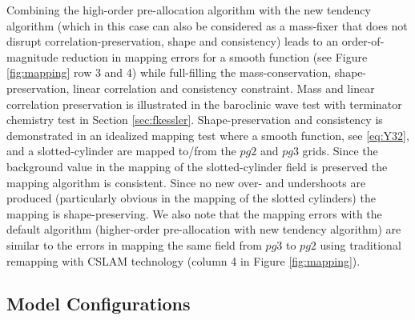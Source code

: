 \documentclass{agujournal}
\begin{document}
Combining the high-order pre-allocation algorithm with the new tendency algorithm (which in this case can also be considered as a mass-fixer that does not disrupt correlation-preservation, shape and consistency) leads to an order-of-magnitude reduction in mapping errors for a smooth function (see Figure \ref{fig:mapping} row 3 and 4) while full-filling the mass-conservation, shape-preservation, linear correlation and consistency  constraint. Mass and linear correlation preservation is illustrated in the baroclinic wave test with terminator chemistry test in Section \ref{sec:fkessler}. Shape-preservation and consistency is demonstrated in an idealized mapping test where a smooth function, see \eqref{eq:Y32}, and a slotted-cylinder \citep[see equation 12 in ][]{LSPT2012GMD} are mapped to/from the $pg2$ and $pg3$ grids. Since the background value in the mapping of the slotted-cylinder field is preserved the mapping algorithm is consistent. Since no new over- and undershoots are produced (particularly obvious in the mapping of the slotted cylinders) the mapping is shape-preserving. We also note that the mapping errors with the default algorithm (higher-order pre-allocation with new tendency algorithm) are similar to the errors in mapping the same field from $pg3$ to $pg2$ using traditional remapping with CSLAM technology (column 4 in Figure \ref{fig:mapping}).


\subsection{Model Configurations}\label{sec:config}
\end{document}

